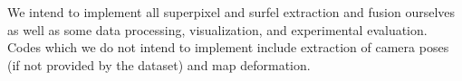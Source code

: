 \documentclass{article}
\begin{document}
    We intend to implement all superpixel and surfel extraction and fusion ourselves as well as some data processing, visualization, and experimental evaluation.  Codes which we do not intend to implement include extraction of camera poses (if not provided by the dataset) and map deformation.
    

\begin{singlespace}  %
	\setlength\bibitemsep{\baselineskip} 
	\printbibliography[title={References}]
\end{singlespace}
\end{document}
